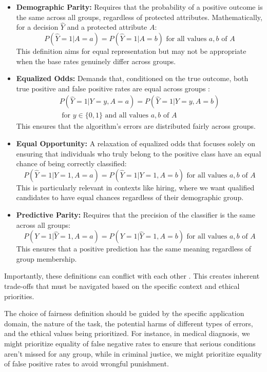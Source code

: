 \documentclass[12pt,a4paper,openright,twoside]{book}
\begin{document}
\begin{itemize}
    \item \textbf{Demographic Parity:} Requires that the probability of a positive outcome is the same across all groups, regardless of protected attributes. Mathematically, for a decision $\hat{Y}$ and a protected attribute $A$:
    \[ P(\hat{Y} = 1 | A = a) = P(\hat{Y} = 1 | A = b) \text{ for all values } a, b \text{ of } A \]
    This definition aims for equal representation but may not be appropriate when the base rates genuinely differ across groups.
    
    \item \textbf{Equalized Odds:} Demands that, conditioned on the true outcome, both true positive and false positive rates are equal across groups \cite{hardt2016equalityopportunitysupervisedlearning}:
    \[ \begin{aligned}
    P(\hat{Y} = 1 | Y = y, A = a) = P(\hat{Y} = 1 | Y = y, A = b) \\
    \text{ for } y \in \{0, 1\} \text{ and all values } a, b \text{ of } A
    \end{aligned} \]
    This ensures that the algorithm's errors are distributed fairly across groups.
    
    \item \textbf{Equal Opportunity:} A relaxation of equalized odds that focuses solely on ensuring that individuals who truly belong to the positive class have an equal chance of being correctly classified:
    \[ P(\hat{Y} = 1 | Y = 1, A = a) = P(\hat{Y} = 1 | Y = 1, A = b) \text{ for all values } a, b \text{ of } A \]
    This is particularly relevant in contexts like hiring, where we want qualified candidates to have equal chances regardless of their demographic group.
    
    \item \textbf{Predictive Parity:} Requires that the precision of the classifier is the same across all groups:
    \[ P(Y = 1 | \hat{Y} = 1, A = a) = P(Y = 1 | \hat{Y} = 1, A = b) \text{ for all values } a, b \text{ of } A \]
    This ensures that a positive prediction has the same meaning regardless of group membership.
\end{itemize}

Importantly, these definitions can conflict with each other \cite{kusner2017counterfactual}. This creates inherent trade-offs that must be navigated based on the specific context and ethical priorities.

The choice of fairness definition should be guided by the specific application domain, the nature of the task, the potential harms of different types of errors, and the ethical values being prioritized. For instance, in medical diagnosis, we might prioritize equality of false negative rates to ensure that serious conditions aren't missed for any group, while in criminal justice, we might prioritize equality of false positive rates to avoid wrongful punishment.
\end{document}
